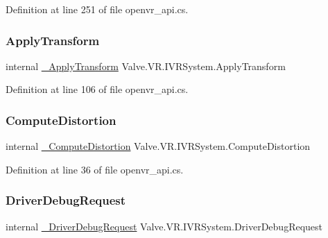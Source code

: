 Definition at line 251 of file openvr\+\_\+api.\+cs.

\mbox{\label{struct_valve_1_1_v_r_1_1_i_v_r_system_a7fac59520ba04459f4389fb1758280fe}} 
\subsubsection{\texorpdfstring{ApplyTransform}{ApplyTransform}}
{\footnotesize\ttfamily internal \mbox{\hyperlink{struct_valve_1_1_v_r_1_1_i_v_r_system_a4b3c449999bda4d5effec48e5b5d6dfa}{\+\_\+\+Apply\+Transform}} Valve.\+V\+R.\+I\+V\+R\+System.\+Apply\+Transform}



Definition at line 106 of file openvr\+\_\+api.\+cs.

\mbox{\label{struct_valve_1_1_v_r_1_1_i_v_r_system_a20be9536f86c1195024062854be1ac59}} 
\subsubsection{\texorpdfstring{ComputeDistortion}{ComputeDistortion}}
{\footnotesize\ttfamily internal \mbox{\hyperlink{struct_valve_1_1_v_r_1_1_i_v_r_system_a88600e2b90cd94cb7fd918636a56cef3}{\+\_\+\+Compute\+Distortion}} Valve.\+V\+R.\+I\+V\+R\+System.\+Compute\+Distortion}



Definition at line 36 of file openvr\+\_\+api.\+cs.

\mbox{\label{struct_valve_1_1_v_r_1_1_i_v_r_system_a8135bdde65be17613157cc5df69f769a}} 
\subsubsection{\texorpdfstring{DriverDebugRequest}{DriverDebugRequest}}
{\footnotesize\ttfamily internal \mbox{\hyperlink{struct_valve_1_1_v_r_1_1_i_v_r_system_a818e951800bb68fb2ae856f7f12dd2fe}{\+\_\+\+Driver\+Debug\+Request}} Valve.\+V\+R.\+I\+V\+R\+System.\+Driver\+Debug\+Request}



